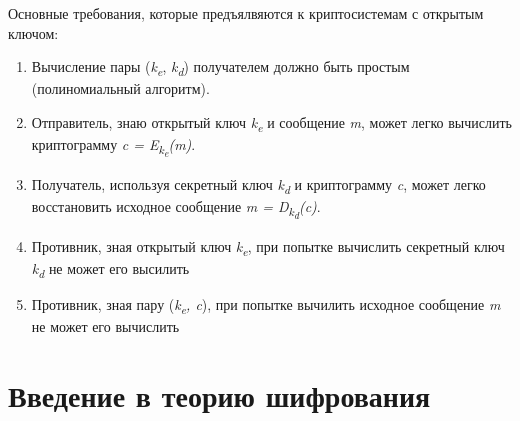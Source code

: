 Основные требования, которые предъялвяются к криптосистемам с открытым ключом:
\begin{enumerate}
	\item Вычисление пары (\textit{k\textsubscript{e}}, \textit{k\textsubscript{d}}) получателем должно быть простым (полиномиальный алгоритм).
	\item Отправитель, знаю открытый ключ \textit{k\textsubscript{e}} и сообщение \textit{m}, может легко вычислить криптограмму \textit{c = E\textsubscript{k\textsubscript{e}}(m)}.
	\item Получатель, используя секретный ключ \textit{k\textsubscript{d}} и криптограмму \textit{c}, может легко восстановить исходное сообщение \textit{m = D\textsubscript{k\textsubscript{d}}(c)}.
	\item Противник, зная открытый ключ \textit{k\textsubscript{e}}, при попытке вычислить секретный ключ \textit{k\textsubscript{d}} не может его высилить
	\item Противник, зная пару (\textit{k\textsubscript{e}, c}), при попытке вычилить исходное сообщение \textit{m} не может его вычислить
\end{enumerate}

\section{Введение в теорию шифрования}

